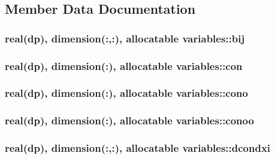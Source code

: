 \subsection{Member Data Documentation}
\hypertarget{classvariables_a3ee0f04d3794cce2bc4b94acc2507775}{
\subsubsection[{bij}]{\setlength{\rightskip}{0pt plus 5cm}real(dp), dimension(\-:,\-:), allocatable variables\-::bij}}\label{classvariables_a3ee0f04d3794cce2bc4b94acc2507775}
\hypertarget{classvariables_a4c205afda65c592ecd9fe704fcabf938}{
\subsubsection[{con}]{\setlength{\rightskip}{0pt plus 5cm}real(dp), dimension(\-:), allocatable variables\-::con}}\label{classvariables_a4c205afda65c592ecd9fe704fcabf938}
\hypertarget{classvariables_abb6179a83e9c5a00689665fafbc348a8}{
\subsubsection[{cono}]{\setlength{\rightskip}{0pt plus 5cm}real(dp), dimension(\-:), allocatable variables\-::cono}}\label{classvariables_abb6179a83e9c5a00689665fafbc348a8}
\hypertarget{classvariables_a603b0ba2a9c45abdf2b52280e6079624}{
\subsubsection[{conoo}]{\setlength{\rightskip}{0pt plus 5cm}real(dp), dimension(\-:), allocatable variables\-::conoo}}\label{classvariables_a603b0ba2a9c45abdf2b52280e6079624}
\hypertarget{classvariables_a816ecf2312ba34dbdb000202938da807}{
\subsubsection[{dcondxi}]{\setlength{\rightskip}{0pt plus 5cm}real(dp), dimension(\-:,\-:), allocatable variables\-::dcondxi}}\label{classvariables_a816ecf2312ba34dbdb000202938da807}
